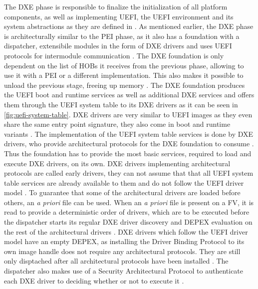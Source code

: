The \ac{DXE} phase is responsible to finalize the initialization of all platform components, as well as implementing \ac{UEFI}, the \ac{UEFI} environment and its system abstractions as they are defined in \cite{uefi-spec}.
As mentioned earlier, the \ac{DXE} phase is architecturally similar to the \ac{PEI} phase, as it also has a foundation with a dispatcher, extensibile modules in the form of \ac{DXE} drivers and uses \ac{UEFI} protocols for intermodule communication \citep[Vol. 2, 2.1]{pi-spec}.
The \ac{DXE} foundation is only dependent on the list of \acp{HOB} it receives from the previous phase, allowing to use it with a \ac{PEI} or a different implementation.
This also makes it possible to unload the previous stage, freeing up memory \cite[Vol. 2, 9.1]{pi-spec}.
The \ac{DXE} foundation produces the \ac{UEFI} boot and runtime services as well as additional \ac{DXE} services and offers them through the \ac{UEFI} system table to its \ac{DXE} drivers as it can be seen in \autoref{fig:uefi-system-table}\cite[Vol. 2, 2.2.1]{pi-spec}.
\ac{DXE} drivers are very similar to \ac{UEFI} images as they even share the same entry point signature, they also come in boot and runtime variants \cite[Vol. 2, 11.2.3]{pi-spec}.
The implementation of the \ac{UEFI} system table services is done by \ac{DXE} drivers, who provide architectural protocols for the \ac{DXE} foundation to consume \cite[Vol. 2, 12.1]{pi-spec}.
Thus the foundation has to provide the most basic services, required to load and execute \ac{DXE} drivers, on its own.
\ac{DXE} drivers implementing architectural protocols are called early drivers, they can not assume that that all \ac{UEFI} system table services are already available to them and do not follow the \ac{UEFI} driver model \cite[Vol. 2, 11.2.1]{pi-spec}.
To guarantee that some of the architectural drivers are loaded before others, an \emph{a priori} file can be used.
When an \emph{a priori} file is present on a \ac{FV}, it is read to provide a deterministic order of drivers, which are to be executed before the dispatcher starts its regular \ac{DXE} driver discovery and \ac{DEPEX} evaluation on the rest of the architectural drivers \cite[Vol. 2, 10.3]{pi-spec}.
\ac{DXE} drivers which follow the \ac{UEFI} driver model have an empty \ac{DEPEX}, as installing the Driver Binding Protocol to its own image handle does not require any architectural protocols.
They are still only disptached after all architectural protocols have been installed \cite[Vol. 2, 11.2.2]{pi-spec}.
The dispatcher also makes use of a Security Architectural Protocol to authenticate each \ac{DXE} driver to deciding whether or not to execute it \cite[Vol. 2, 10.13]{pi-spec}.


